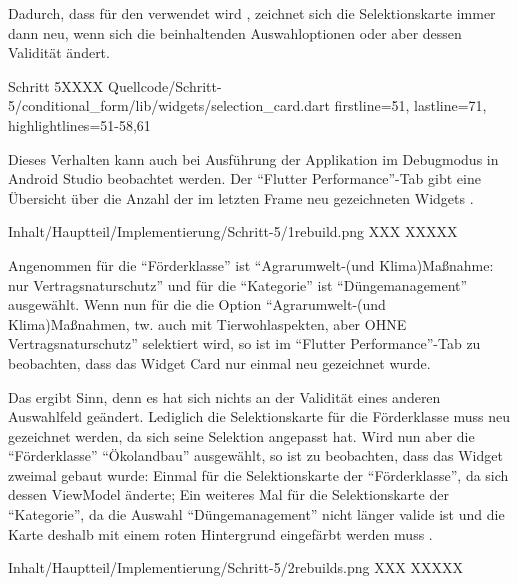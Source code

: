 Dadurch,
dass  für den  verwendet wird ,
zeichnet sich die Selektionskarte immer dann neu,
wenn sich die beinhaltenden Auswahloptionen oder aber dessen Validität ändert.


\begin{alexlisting}{Schritt 5}{XXXX}
  {Quellcode/Schritt-5/conditional_form/lib/widgets/selection_card.dart}
  {firstline=51, lastline=71, highlightlines={51-58,61}}
  \label{lst:Schritt5needsRepaint}
\end{alexlisting} 

Dieses Verhalten kann auch bei Ausführung der Applikation im Debugmodus in Android Studio beobachtet werden.
Der \enquote{Flutter Performance}-Tab gibt eine Übersicht über die Anzahl der im letzten Frame neu gezeichneten Widgets \Abb{\ref{fig:Schritt51rebuild}}. 
\begin{alexfigure}{Inhalt/Hauptteil/Implementierung/Schritt-5/1rebuild.png}
  {XXX}
  {XXXXX}

  \label{fig:Schritt51rebuild}

\end{alexfigure}
Angenommen für die \enquote{Förderklasse} ist \enquote{Agrarumwelt-(und Klima)Maßnahme: nur Vertragsnaturschutz} und für die \enquote{Kategorie} ist \enquote{Düngemanagement} ausgewählt.
Wenn nun für die  die Option \enquote{Agrarumwelt-(und Klima)Maßnahmen, tw. auch mit Tierwohlaspekten, aber OHNE Vertragsnaturschutz}  selektiert wird,
so ist im \enquote{Flutter Performance}-Tab zu beobachten,
dass das Widget Card nur einmal neu gezeichnet wurde.



Das ergibt Sinn, denn es hat sich nichts an der Validität eines anderen Auswahlfeld geändert.
Lediglich die Selektionskarte für die Förderklasse muss neu gezeichnet werden,
da sich seine Selektion angepasst hat.
Wird nun aber die \enquote{Förderklasse} \enquote{Ökolandbau} ausgewählt,
so ist zu beobachten,
dass das  Widget zweimal gebaut wurde:
Einmal für die Selektionskarte der \enquote{Förderklasse}, da sich dessen ViewModel änderte;
Ein weiteres Mal für die Selektionskarte der \enquote{Kategorie},
da die Auswahl \enquote{Düngemanagement} nicht länger valide ist
und die Karte deshalb mit einem roten Hintergrund eingefärbt werden muss \Abb{\ref{fig:Schritt52rebuilds}}.

\begin{alexfigure}{Inhalt/Hauptteil/Implementierung/Schritt-5/2rebuilds.png}
  {XXX}
  {XXXXX}

  \label{fig:Schritt52rebuilds}

\end{alexfigure}

